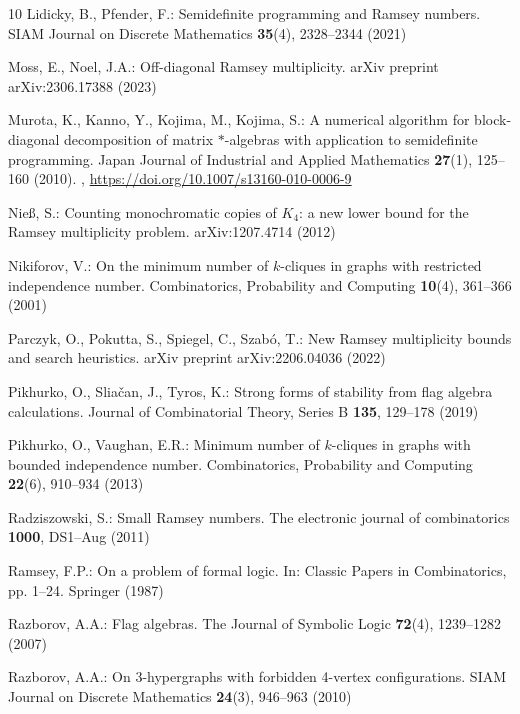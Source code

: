 \documentclass[a4paper,11pt]{article}
\numberwithin{equation}{section}
\begin{document}
\begin{thebibliography}{10}
Lidicky, B., Pfender, F.: Semidefinite programming and Ramsey numbers. SIAM
  Journal on Discrete Mathematics  \textbf{35}(4),  2328--2344 (2021)

Moss, E., Noel, J.A.: Off-diagonal {R}amsey multiplicity. arXiv preprint
  arXiv:2306.17388  (2023)

Murota, K., Kanno, Y., Kojima, M., Kojima, S.: A numerical algorithm for
  block-diagonal decomposition of matrix $*$-algebras
  with application to semidefinite programming. Japan Journal of Industrial and
  Applied Mathematics  \textbf{27}(1),  125--160 (2010).
  ,
  \url{https://doi.org/10.1007/s13160-010-0006-9}

Nie{\ss}, S.: Counting monochromatic copies of {$K_4$}: a new lower bound for
  the {R}amsey multiplicity problem. arXiv:1207.4714  (2012)

Nikiforov, V.: On the minimum number of $k$-cliques in graphs with restricted
  independence number. Combinatorics, Probability and Computing
  \textbf{10}(4),  361--366 (2001)

Parczyk, O., Pokutta, S., Spiegel, C., Szab{\'o}, T.: New {R}amsey multiplicity
  bounds and search heuristics. arXiv preprint arXiv:2206.04036  (2022)

Pikhurko, O., Slia{\v{c}}an, J., Tyros, K.: Strong forms of stability from flag
  algebra calculations. Journal of Combinatorial Theory, Series B
  \textbf{135},  129--178 (2019)

Pikhurko, O., Vaughan, E.R.: Minimum number of $k$-cliques in graphs with
  bounded independence number. Combinatorics, Probability and Computing
  \textbf{22}(6),  910--934 (2013)

Radziszowski, S.: Small {R}amsey numbers. The electronic journal of
  combinatorics  \textbf{1000},  DS1--Aug (2011)

Ramsey, F.P.: On a problem of formal logic. In: Classic Papers in
  Combinatorics, pp. 1--24. Springer (1987)

Razborov, A.A.: Flag algebras. The Journal of Symbolic Logic  \textbf{72}(4),
  1239--1282 (2007)

Razborov, A.A.: On 3-hypergraphs with forbidden 4-vertex configurations. SIAM
  Journal on Discrete Mathematics  \textbf{24}(3),  946--963 (2010)


\end{thebibliography}
\end{document}
